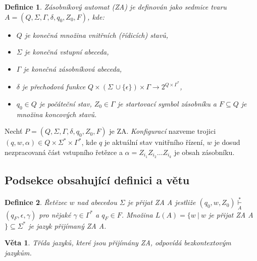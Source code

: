 \documentclass[a4paper, 11pt]{article}
\newtheorem{definice}{Definice}
\newtheorem{veta}{Věta}
\begin{document}
\begin{definice}
\emph{Zásobníkový automat} (ZA) je definován jako sedmice tvaru $A=(Q,\Sigma,\Gamma,\delta,q_0,Z_0,F)$, kde:~\label{def1}
\begin{itemize}
\item $Q$ je konečná množina \emph{vnitřních (řídicích) stavů},
\item $\Sigma$ je konečná \emph{vstupní abeceda},
\item $\Gamma$ je konečná \emph{zásobníková abeceda},
\item $\delta$ je \emph{přechodová funkce} $Q\times(\Sigma\,\cup\{\epsilon\})\times\Gamma\rightarrow2^{Q\times\Gamma^*}$,
\item $q_0 \in Q$ je \emph{počáteční stav}, $Z_0 \in \Gamma$ je \emph{startovací symbol zásobníku} a $F \subseteq Q$ je 
    množina \emph{koncových stavů}. 
\end{itemize} 
\end{definice}
Nechť $P=(Q,\Sigma,\Gamma,\delta,q_0,Z_0,F)$ je ZA. \emph{Konfigurací} nazveme trojici
$(q,w,\alpha)\in Q\times\Sigma^*\times\Gamma^*$, kde $q$ je aktuální stav vnitřního řízení, $w$ je dosud
nezpracovaná část vstupního řetězce a $\alpha=Z_{i_1}Z_{i_2}\ldots Z_{i_k}$ je obsah zásobníku.

\subsection{Podsekce obsahující definici a větu}
\begin{definice}
\emph{Řetězec} $w$ \emph{nad abecedou} $\Sigma$ \emph{je přijat ZA} A jestliže $(q_0,w,Z_0)\underset{A}{\overset{*}{\vdash}}$
$(q_F,\epsilon,\gamma) $ pro nějaké $\gamma \in \Gamma^*$ a ${q_F\in F}$. Množina $L(A)=\{w\ |\ w$ 
je přijat ZA A$\} \subseteq \Sigma^*$ je \emph{jazyk přijímaný ZA} A. 
\end{definice}
\begin{veta}
Třída jazyků, které jsou přijímány ZA, odpovídá \emph{bezkontextovým jazykům}.
\end{veta}
\end{document}
